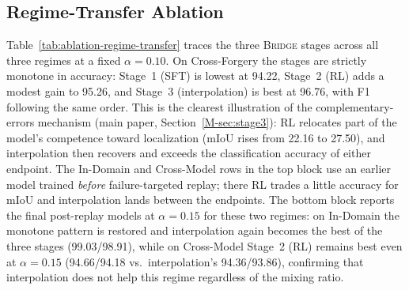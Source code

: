 \documentclass[10pt,twocolumn,letterpaper]{article}
\newcommand{\bridge}{\textsc{Bridge}}
\begin{document}
\subsection{Regime-Transfer Ablation}
Table~\ref{tab:ablation-regime-transfer} traces the three \bridge{} stages across all three regimes at a fixed $\alpha{=}0.10$. On Cross-Forgery the stages are strictly monotone in accuracy: Stage~1 (SFT) is lowest at 94.22, Stage~2 (RL) adds a modest gain to 95.26, and Stage~3 (interpolation) is best at 96.76, with F1 following the same order. This is the clearest illustration of the complementary-errors mechanism (main paper, Section~\ref{M-sec:stage3}): RL relocates part of the model's competence toward localization (mIoU rises from 22.16 to 27.50), and interpolation then recovers and exceeds the classification accuracy of either endpoint. The In-Domain and Cross-Model rows in the top block use an earlier model trained \emph{before} failure-targeted replay; there RL trades a little accuracy for mIoU and interpolation lands between the endpoints. The bottom block reports the final post-replay models at $\alpha{=}0.15$ for these two regimes: on In-Domain the monotone pattern is restored and interpolation again becomes the best of the three stages (99.03/98.91), while on Cross-Model Stage~2 (RL) remains best even at $\alpha{=}0.15$ (94.66/94.18 vs.\ interpolation's 94.36/93.86), confirming that interpolation does not help this regime regardless of the mixing ratio.
\end{document}
